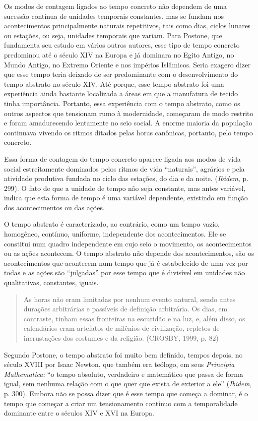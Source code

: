 Os modos de contagem ligados ao tempo concreto não dependem de uma
sucessão contínua de unidades temporais constantes, mas se fundam nos
acontecimentos principalmente naturais repetitivos, tais como dias,
ciclos lunares ou estações, ou seja, unidades temporais que variam. Para
Postone, que fundamenta seu estudo em vários outros autores, esse tipo
de tempo concreto predominou até o século XIV na Europa e já dominara no
Egito Antigo, no Mundo Antigo, no Extremo Oriente e nos impérios
Islâmicos. Seria exagero dizer que esse tempo teria deixado de ser
predominante com o desenvolvimento do tempo abstrato no século XIV. Até
porque, esse tempo abstrato foi uma experiência ainda bastante
localizada a áreas em que a manufatura de tecido tinha importância.
Portanto, essa experiência com o tempo abstrato, como os outros aspectos
que tensionam rumo à modernidade, começaram de modo restrito e foram
amadurecendo lentamente no seio social. A enorme maioria da população
continuava vivendo os ritmos ditados pelas horas canônicas, portanto,
pelo tempo concreto.

Essa forma de contagem do tempo concreto aparece ligada aos modos de
vida social estreitamente dominados pelos ritmos de vida ``naturais'',
agrários e pela atividade produtiva fundada no ciclo das estações, do
dia e da noite. (\emph{Ibidem}, p. 299). O fato de que a unidade de
tempo não seja constante, mas antes variável, indica que esta forma de
tempo é uma variável dependente, existindo em função dos acontecimentos
ou das ações.

O tempo abstrato é caracterizado, ao contrário, como um tempo vazio,
homogêneo, contínuo, uniforme, independente dos acontecimentos. Ele se
constitui num quadro independente em cujo seio o movimento, os
acontecimentos ou as ações acontecem. O tempo abstrato não depende dos
acontecimentos, são os acontecimentos que acontecem num tempo que já é
estabelecido de uma vez por todas e as ações são ``julgadas'' por esse
tempo que é divisível em unidades não qualitativas, constantes, iguais.

\begin{quote}
As horas não eram limitadas por nenhum evento natural, sendo antes
durações arbitrárias e passíveis de definição arbitrária. Os dias, em
contraste, tinham essas fronteiras na escuridão e na luz, e, além disso,
os calendários eram artefatos de milênios de civilização, repletos de
incrustações dos costumes e da religião. (CROSBY, 1999, p. 82)
\end{quote}

Segundo Postone, o tempo abstrato foi muito bem definido, tempos depois,
no século XVIII por Isaac Newton, que também era teólogo, em seus
\emph{Principia Mathematica:} ``o tempo absoluto, verdadeiro e
matemático que passa de forma igual, sem nenhuma relação com o que quer
que exista de exterior a ele'' (\emph{Ibidem}, p. 300). Embora não se
possa dizer que é esse tempo que começa a dominar, é o tempo que começar
a criar um tensionamento contínuo com a temporalidade dominante entre o
séculos XIV e XVI na Europa.

